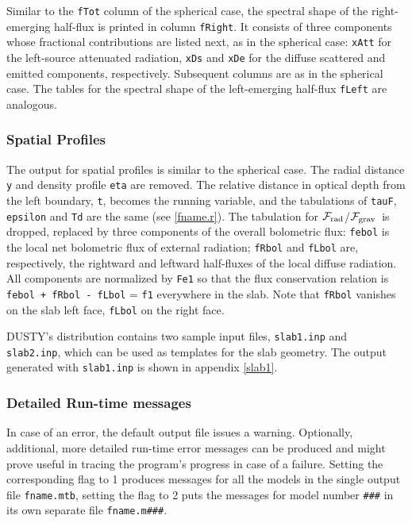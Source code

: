 \documentclass[11pt]{article}
\def\D  {{\sf DUSTY}}
\def\sub#1{_{\rm #1}}
\def\Frad {\hbox{${\cal F}\sub{rad}$}}
\def\Fgrav{\hbox{${\cal F}\sub{grav}$}}
\begin{document}
Similar to the {\tt fTot} column of the spherical case, the spectral shape of
the right-emerging half-flux is printed in column {\tt fRight}.  It consists of
three components whose fractional contributions are listed next, as in the
spherical case: {\tt xAtt} for the left-source attenuated radiation, {\tt xDs}
and {\tt xDe} for the diffuse scattered and emitted components, respectively.
Subsequent columns are as in the spherical case. The tables for the spectral
shape of the left-emerging half-flux {\tt fLeft} are analogous.

\subsubsection{Spatial Profiles}
The output for spatial profiles is similar to the spherical case. The radial
distance {\tt y} and density profile {\tt eta} are removed.  The relative
distance in optical depth from the left boundary, {\tt t}, becomes the running
variable, and the tabulations of {\tt tauF}, {\tt epsilon} and {\tt Td} are the
same (see \ref{fname.r}).  The tabulation for \Frad/\Fgrav\ is dropped,
replaced by three components of the overall bolometric flux: {\tt febol} is the
local net bolometric flux of external radiation; {\tt fRbol} and {\tt fLbol}
are, respectively, the rightward and leftward half-fluxes of the local diffuse
radiation. All components are normalized by {\tt Fe1} so that the flux
conservation relation is {\tt febol + fRbol - fLbol} = {\tt f1} everywhere in
the slab. Note that {\tt fRbol} vanishes on the slab left face, {\tt fLbol} on
the right face.

\bigskip
\D's distribution contains two sample input files, {\tt slab1.inp} and {\tt
slab2.inp}, which can be used as templates for the slab geometry.  The output
generated with {\tt slab1.inp} is shown in appendix \ref{slab1}.


\subsubsection{Detailed Run-time messages}
\label{fname.m}

In case of an error, the default output file issues a warning. Optionally,
additional, more detailed run-time error messages can be produced and might
prove useful in tracing the program's progress in case of a failure. Setting
the corresponding flag to 1 produces messages for all the models in the single
output file {\tt fname.mtb}, setting the flag to 2 puts the messages for model
number {\tt \#\#\#} in its own separate file {\tt fname.m\#\#\#}.
\end{document}
